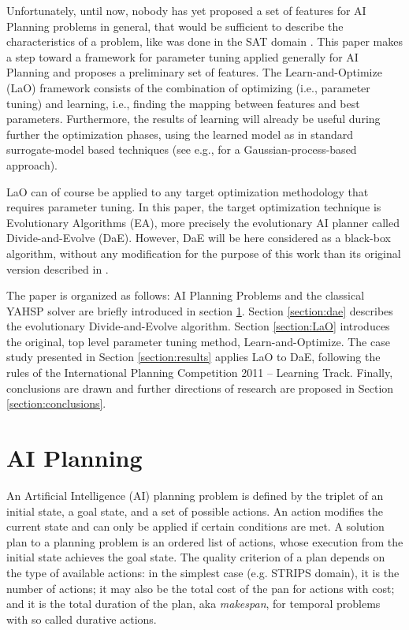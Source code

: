 \documentclass[runningheads,a4paper]{llncs}
\begin{document}
Unfortunately, until now, nobody has yet proposed a set of features for AI Planning problems in general, that would be sufficient to describe the characteristics of a problem, like was done in the SAT domain \cite{Hutter06}. This paper makes a step toward a framework for parameter tuning applied generally for AI Planning and proposes a preliminary set of features. The Learn-and-Optimize (LaO) framework consists of the combination of optimizing (i.e., parameter tuning) and learning, i.e., finding the mapping between features and best parameters. Furthermore, the results of learning will already be useful during further the optimization phases, using the learned model as in standard surrogate-model based techniques (see e.g., \cite{Bardenet} for a Gaussian-process-based approach).

LaO can of course be applied to any target optimization methodology that requires parameter tuning. In this paper, the target optimization technique is Evolutionary Algorithms (EA), more precisely the evolutionary AI planner called Divide-and-Evolve (DaE). However, DaE will be here considered as a black-box algorithm, without any modification for the purpose of this work than its original version described in \cite{BibEvoCop:2010}. 

The paper is organized as follows: AI Planning Problems and the classical YAHSP solver are briefly introduced in section \ref{section:planning}. Section \ref{section:dae} describes the evolutionary  Divide-and-Evolve algorithm. Section \ref{section:LaO} introduces the original, top level parameter tuning method, Learn-and-Optimize. The case study presented in Section \ref{section:results} applies LaO to DaE, following the rules of the International Planning Competition 2011 -- Learning Track. Finally, conclusions are drawn and further directions of research are proposed in Section \ref{section:conclusions}. 

\section{AI Planning}
\label{section:planning}

An Artificial Intelligence (AI) planning problem is defined by the triplet of an initial state, a goal state, and a set of possible actions. An action modifies the current state and can only be applied if certain conditions are met. A solution plan to a planning problem is an ordered list of actions, whose execution from the initial state achieves the goal state. The quality criterion of a plan depends on the type of available actions: in the simplest case (e.g. STRIPS domain), it is the number of actions; it may also be the total cost of the pan for actions with cost; and it is the total duration of the plan, aka {\em makespan}, for temporal problems with so called durative actions.
\end{document}
